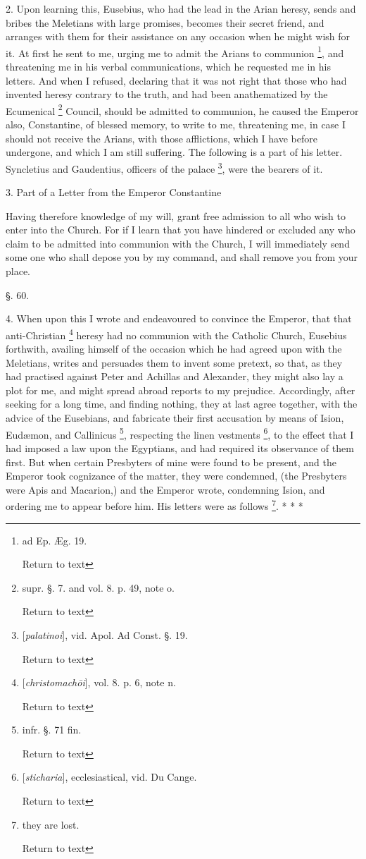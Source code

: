 2. Upon learning this, Eusebius, who had the lead
in the Arian heresy, sends and bribes the Meletians with large
promises, becomes their secret friend, and arranges with them for
their assistance on any occasion when he might wish for it. At first
he sent to me, urging me to admit the Arians to communion \footnote{ad Ep. Æg. 19.

Return to text}, and threatening me in his verbal communications, which he
requested me in his letters. And when I refused, declaring that it was
not right that those who had invented heresy contrary to the truth,
and had been anathematized by the Ecumenical \footnote{supr. §. 7. and vol. 8. p. 49, note o.

Return to text} Council, should be admitted to communion, he caused the Emperor
also, Constantine, of blessed memory, to write to me, threatening me,
in case I should not receive the Arians, with those afflictions, which
I have before undergone, and which I am still suffering. The following
is a part of his letter. Syncletius and Gaudentius, officers of the
palace \footnote{[\emph{palatinoi}], vid. Apol. Ad Const. §. 19.

Return to text}, were the
bearers of it.

3. Part of a Letter from the Emperor Constantine

Having therefore knowledge of my will, grant free
admission to all who wish to enter into the Church. For if I learn
that you have hindered or excluded any who claim to be admitted into
communion with the Church, I will immediately send some one who shall
depose you by my command, and shall remove you from your place.

§. 60.

4. When upon this I wrote and endeavoured to
convince the Emperor, that that anti-Christian \footnote{[\emph{christomach\={o}i}], vol. 8. p. 6, note n.

Return to text} heresy had no communion with the Catholic Church, Eusebius
forthwith, availing himself of the occasion which he had agreed upon
with the Meletians, writes and persuades them to invent some pretext,
so that, as they had practised against Peter and Achillas and
Alexander, they might also lay a plot for me, and might spread abroad
reports to my prejudice. Accordingly, after seeking for a long time,
and finding nothing, they at last agree together, with the advice of
the Eusebians, and fabricate their first accusation by means of Ision,
Eudæmon, and Callinicus \footnote{infr. §. 71 fin.

Return to text},
respecting the linen vestments \footnote{[\emph{sticharia}], ecclesiastical, vid. Du Cange.

Return to text}, to the effect that I had imposed a law upon the Egyptians, and
had required its observance of them first. But when certain Presbyters
of mine were found to be present, and the Emperor took cognizance of
the matter, they were condemned, (the Presbyters were Apis and
Macarion,) and the Emperor wrote, condemning Ision, and ordering me to
appear before him. His letters were as follows \footnote{they are lost.

Return to text}. * *
*

